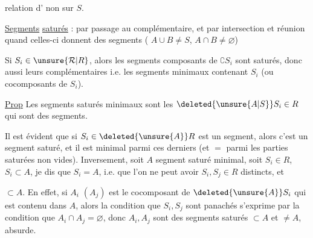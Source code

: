  relation d' non  sur $S$.

\uline{Segments}  \uline{saturés} :  par passage au complémentaire, et par intersection et réunion quand celles-ci donnent des segments ( $A\cup B\ne S$, $A\cap B\ne\varnothing$)

Si $S_i\in\unsure{\mathcal{R}|R}$, alors les segments composants de $\complement S_i$ sont saturés, donc aussi leurs complémentaires i.e. les segments minimaux contenant $S_i$ (ou  cocomposants de $S_i$). 

\noindent\llap{\rule[-.92\baselineskip]{.4pt}{1.8\baselineskip}\hspace{.35em}}\uline{Prop} Les segments saturés minimaux sont les $\deleted{\unsure{A|S}}S_i\in R$ qui sont des segments.

\reversemarginpar{}

Il est évident que si $S_i\in\deleted{\unsure{A}}R$ est un segment, alors c'est un segment saturé, et il est minimal parmi ces derniers (et $=$ parmi les parties saturées non vides). Inversement, soit $A$ segment saturé minimal,  soit $S_i\in R$, $S_i\subset A$,  je dis que $S_i=A$,  i.e. que l'on ne peut avoir $S_i,S_j\in R$ distincts, et
\par\noindent\begin{minipage}[t]{.23\linewidth}
\vspace{0pt}


\end{minipage}\hfill\begin{minipage}[t]{.73\linewidth}
\vspace{0pt}
$\subset A$. En effet, si $A_i$ $(A_j)$ est le  cocomposant de $\deleted{\unsure{A}}S_i$ qui est contenu dans $A$, alors la condition que $S_i,S_j$ sont  panachés s'exprime par la condition que $A_i\cap A_j=\varnothing$, donc $A_i,A_j$ sont des segments saturés $\subset A$ et $\ne A$, absurde.
\end{minipage}
\normalmarginpar

